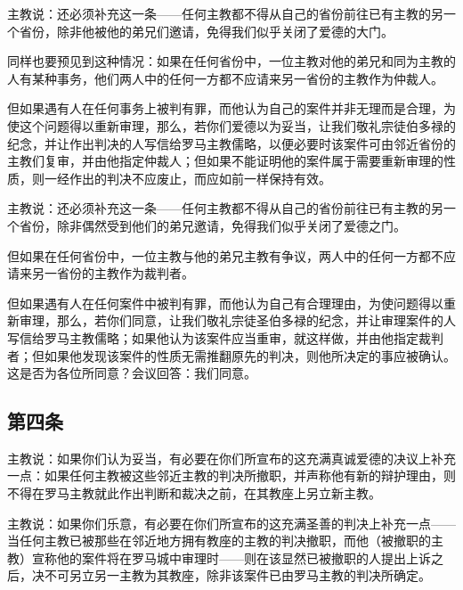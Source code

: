 主教说：还必须补充这一条——任何主教都不得从自己的省份前往已有主教的另一个省份，除非他被他的弟兄们邀请，免得我们似乎关闭了爱德的大门。\par

同样也要预见到这种情况：如果在任何省份中，一位主教对他的弟兄和同为主教的人有某种事务，他们两人中的任何一方都不应请来另一省份的主教作为仲裁人。\par

但如果遇有人在任何事务上被判有罪，而他认为自己的案件并非无理而是合理，为使这个问题得以重新审理，那么，若你们爱德以为妥当，让我们敬礼宗徒伯多禄的纪念，并让作出判决的人写信给罗马主教儒略，以便必要时该案件可由邻近省份的主教们复审，并由他指定仲裁人；但如果不能证明他的案件属于需要重新审理的性质，则一经作出的判决不应废止，而应如前一样保持有效。\par

主教说：还必须补充这一条——任何主教都不得从自己的省份前往已有主教的另一个省份，除非偶然受到他们的弟兄邀请，免得我们似乎关闭了爱德之门。\par

但如果在任何省份中，一位主教与他的弟兄主教有争议，两人中的任何一方都不应请来另一省份的主教作为裁判者。\par

但如果遇有人在任何案件中被判有罪，而他认为自己有合理理由，为使问题得以重新审理，那么，若你们同意，让我们敬礼宗徒圣伯多禄的纪念，并让审理案件的人写信给罗马主教儒略；如果他认为该案件应当重审，就这样做，并由他指定裁判者；但如果他发现该案件的性质无需推翻原先的判决，则他所决定的事应被确认。这是否为各位所同意？会议回答：我们同意。\par


\subsection{第四条}

主教说：如果你们认为妥当，有必要在你们所宣布的这充满真诚爱德的决议上补充一点：如果任何主教被这些邻近主教的判决所撤职，并声称他有新的辩护理由，则不得在罗马主教就此作出判断和裁决之前，在其教座上另立新主教。\par

主教说：如果你们乐意，有必要在你们所宣布的这充满圣善的判决上补充一点——当任何主教已被那些在邻近地方拥有教座的主教的判决撤职，而他（被撤职的主教）宣称他的案件将在罗马城中审理时——则在该显然已被撤职的人提出上诉之后，决不可另立另一主教为其教座，除非该案件已由罗马主教的判决所确定。\par

